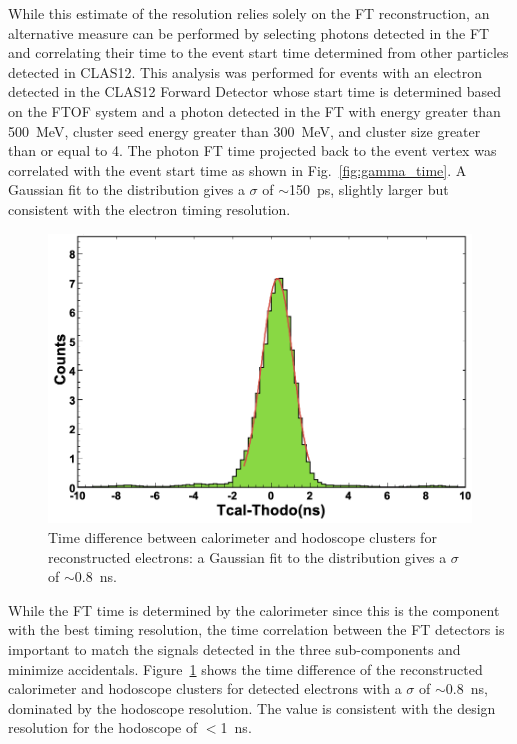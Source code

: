 While this estimate of the resolution relies solely on the FT reconstruction, an alternative measure can be
performed by selecting photons detected in the FT and correlating their time to the event start time determined
from other particles detected in CLAS12. This analysis was performed for events with an electron detected in
the CLAS12 Forward Detector whose start time is determined based on the FTOF system and a photon detected in
the FT with energy greater than 500~MeV, cluster seed energy greater than 300~MeV, and cluster size greater than
or equal to 4. The photon FT time projected back to the event vertex was correlated with the event start time as
shown in Fig.~\ref{fig:gamma_time}. A Gaussian fit to the distribution gives a $\sigma$ of $\sim$150~ps, slightly
larger but consistent with the electron timing resolution.

\begin{figure}[h]
\includegraphics[height=0.6\columnwidth]{fig/ftcalhodo_time.png}
\caption{Time difference between calorimeter and hodoscope clusters for reconstructed electrons: a Gaussian fit
  to the distribution gives a $\sigma$ of $\sim$0.8~ns.}
\label{fig:ftcalhodo_time}
\end{figure}

While the FT time is determined by the calorimeter since this is the component with the best timing resolution,
the time correlation between the FT detectors is important to match the signals detected in the three
sub-components and minimize accidentals. Figure~\ref{fig:ftcalhodo_time} shows the time difference of the
reconstructed calorimeter and hodoscope clusters for detected electrons with a $\sigma$ of $\sim$0.8~ns,
dominated by the hodoscope resolution. The value is consistent with the design resolution for the hodoscope of
$<$1~ns.

